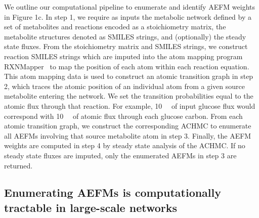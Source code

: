 \documentclass[12pt]{article}
\begin{document}
We outline our computational pipeline to enumerate and identify AEFM
weights in Figure 1c. In step 1, we require as inputs the metabolic
network defined by a set of metabolites and reactions encoded as
a stoichiometry matrix, the metabolite structures denoted as SMILES
strings, and (optionally) the steady state fluxes. From the stoichiometry
matrix and SMILES strings, we construct reaction SMILES strings which are
imputed into the atom mapping program
RXNMapper~\citep{Schwaller2021extraction} to map the position of each atom
within each reaction equation. This atom mapping data is used to construct
an atomic transition graph in step 2, which traces the atomic position of
an individual atom from a given source metabolite entering the network. We
set the transition probabilities equal to the atomic flux through that
reaction. For example, 10\SI{}{\milli\molar} of input glucose flux would
correspond with 10\SI{}{\milli\molar} of atomic flux through each glucose
carbon. From each atomic transition graph, we construct the corresponding
ACHMC to enumerate all AEFMs involving that source metabolite atom in step
3. Finally, the AEFM weights are computed in step 4 by steady state
   analysis of the ACHMC. If no steady state fluxes are imputed, only the
   enumerated AEFMs in step 3 are returned.

\subsection*{Enumerating AEFMs is computationally tractable in large-scale networks}
\end{document}
